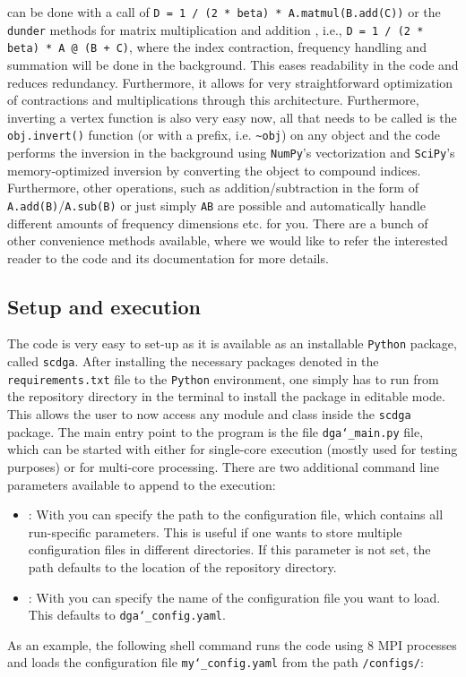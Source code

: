\documentclass[\main/main.tex]{subfiles}
\begin{document}
can be done with a call of \texttt{D = 1 / (2 * beta) * A.matmul(B.add(C))} or the \texttt{dunder} methods for matrix multiplication  and addition \say{\texttt{+}}, i.e., \texttt{D = 1 / (2 * beta) * A @ (B + C)}, where the index contraction, frequency handling and summation will be done in the background. This eases readability in the code and reduces redundancy. Furthermore, it allows for very straightforward optimization of contractions and multiplications through this architecture. Furthermore, inverting a vertex function is also very easy now, all that needs to be called is the \texttt{obj.invert()} function (or with a \say{\sim} prefix, i.e. \texttt{\sim obj}) on any object and the code performs the inversion in the background using \texttt{NumPy}'s vectorization and \texttt{SciPy}'s memory-optimized inversion by converting the object to compound indices. Furthermore, other operations, such as addition/subtraction in the form of \texttt{A.add(B)}/\texttt{A.sub(B)} or just simply \texttt{A\pm B} are possible and automatically handle different amounts of frequency dimensions etc. for you. There are a bunch of other convenience methods available, where we would like to refer the interested reader to the code and its documentation for more details.


\subsection{Setup and execution}

The code is very easy to set-up as it is available as an installable \texttt{Python} package, called \texttt{scdga}. After installing the necessary packages denoted in the \texttt{requirements.txt} file to the \texttt{Python} environment, one simply has to run  from the repository directory in the terminal to install the package in editable mode. This allows the user to now access any module and class inside the \texttt{scdga} package. The main entry point to the program is the file \texttt{dga\char`_main.py} file, which can be started with either  for single-core execution (mostly used for testing purposes) or \mbox{} for multi-core processing. There are two additional command line parameters available to append to the execution:
\begin{itemize}
\item{}: With  you can specify the path to the configuration file, which contains all run-specific parameters. This is useful if one wants to store multiple configuration files in different directories. If this parameter is not set, the path defaults to the location of the repository directory.
\item{}: With  you can specify the name of the configuration file you want to load. This defaults to \texttt{dga\char`_config.yaml}.
\end{itemize}
As an example, the following shell command runs the code using 8 MPI processes and loads the configuration file \texttt{my\char`_config.yaml} from the path \texttt{/configs/}:
\end{document}
